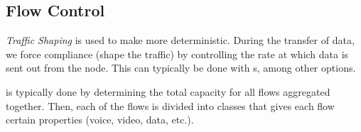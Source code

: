 \subsection{Flow Control}\label{subsec:Flow_Control}

\begin{definition}\label{def:Traffic_Shaping}
  \emph{Traffic Shaping} is used to make  more deterministic.
  During the transfer of data, we force compliance (shape the traffic) by controlling the rate at which data is sent out from the node.
  This can typically be done with s, among other options.
\end{definition}

 is typically done by determining the total capacity for all flows aggregated together.
Then, each of the flows is divided into classes that gives each flow certain properties (voice, video, data, etc.).

\begin{algorithm}[H]
  \DontPrintSemicolon{}
  \BlankLine{}

\end{algorithm}

